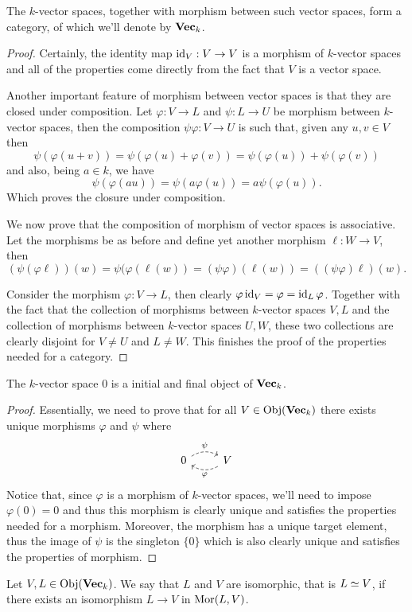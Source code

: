 \begin{proposition}\label{prop: category of vector spaces}
   The \(k\)-vector spaces, together with morphism between such vector spaces,
   form a category, of which we'll denote by \({\textbf{Vec}}_k\).
\end{proposition}

\begin{proof}
   Certainly, the identity map \(\operatorname{id}_V : V \to V\) is a morphism of \(k\)-vector
   spaces and all of the properties come directly from the fact that \(V\) is a
   vector space.

   Another important feature of morphism between vector spaces is that they are
   closed under composition. Let \(\varphi : V \to L\) and \(\psi : L \to U\) be
   morphism between \(k\)-vector spaces, then the composition \(\psi
   \varphi : V \to U\) is such that, given any \(u, v \in V\) then
   \[
      \psi(\varphi(u+v)) = \psi(\varphi(u) + \varphi(v)) = \psi(\varphi(u)) +
      \psi(\varphi(v))
   \]
   and also, being \(a \in k\), we have
   \[
      \psi(\varphi(au)) = \psi(a\varphi(u)) = a \psi(\varphi(u)).
   \]
   Which proves the closure under composition.

   We now prove that the composition of morphism of vector spaces is
   associative. Let the morphisms be as before and define yet another morphism
   \(\ell : W \to V\), then
   \[
      (\psi  (\varphi  \ell)) (w) = \psi(\varphi(\ell(w)) = (\psi
      \varphi)(\ell(w)) = ((\psi  \varphi)  \ell) (w).
   \]

   Consider the morphism \(\varphi : V \to L\), then clearly \(\varphi
   \operatorname{id}_V = \varphi = \operatorname{id}_L  \varphi\). Together with the fact that the
   collection of morphisms between \(k\)-vector spaces \(V, L\) and the
   collection of morphisms between \(k\)-vector spaces \(U, W\), these two
   collections are clearly disjoint for \(V \neq U\) and \(L \neq W\). This
   finishes the proof of the properties needed for a category.
\end{proof}

\begin{proposition}
   The \(k \)-vector space \(0\) is a initial and final object of
   \({\textbf{Vec}}_k\).
\end{proposition}

\begin{proof}
   Essentially, we need to prove that for all \(V \in \operatorname{Obj}({\textbf{Vec}}_k)\) there
   exists unique morphisms \(\varphi\) and \(\psi\) where
   \[
     \begin{tikzcd}
       0
       \ar[r, bend left, dashed, "\psi"]
         &V
         \ar[l, bend left, dashed, "\varphi"]
     \end{tikzcd}
   \]
   Notice that, since \(\varphi\) is a morphism of \(k\)-vector spaces, we'll
   need to impose \(\varphi(0) = 0\) and thus this morphism is clearly unique
   and satisfies the properties needed for a morphism. Moreover, the morphism
   has a unique target element, thus the image of \(\psi\) is the singleton
   \(\{0\}\) which is also clearly unique and satisfies the properties of
   morphism.
\end{proof}

\begin{definition}[Isomorphism]
   Let \(V, L \in \operatorname{Obj}({\textbf{Vec}}_k)\). We say that \(L\) and \(V\) are
   isomorphic, that is \(L \simeq V\), if there exists an isomorphism \(L \to V\)
   in \(\operatorname{Mor}(L, V)\).
\end{definition}
